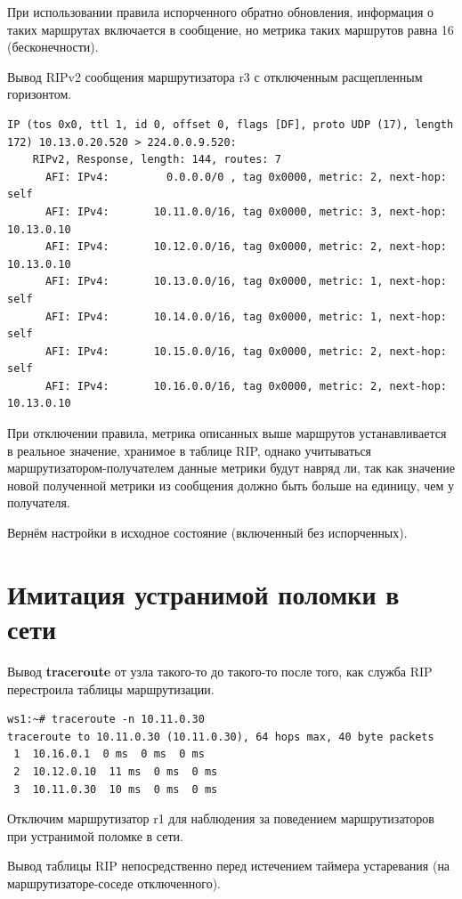 \documentclass[a4paper,12pt]{article}
\begin{document}
При использовании правила испорченного обратно обновления, информация о таких маршрутах включается в сообщение, но метрика таких маршрутов равна 16 (бесконечности).


Вывод RIPv2 сообщения маршрутизатора r3 с отключенным расщепленным горизонтом.

\begin{Verbatim}
IP (tos 0x0, ttl 1, id 0, offset 0, flags [DF], proto UDP (17), length 172) 10.13.0.20.520 > 224.0.0.9.520: 
	RIPv2, Response, length: 144, routes: 7
	  AFI: IPv4:         0.0.0.0/0 , tag 0x0000, metric: 2, next-hop: self
	  AFI: IPv4:       10.11.0.0/16, tag 0x0000, metric: 3, next-hop: 10.13.0.10
	  AFI: IPv4:       10.12.0.0/16, tag 0x0000, metric: 2, next-hop: 10.13.0.10
	  AFI: IPv4:       10.13.0.0/16, tag 0x0000, metric: 1, next-hop: self
	  AFI: IPv4:       10.14.0.0/16, tag 0x0000, metric: 1, next-hop: self
	  AFI: IPv4:       10.15.0.0/16, tag 0x0000, metric: 2, next-hop: self
	  AFI: IPv4:       10.16.0.0/16, tag 0x0000, metric: 2, next-hop: 10.13.0.10
\end{Verbatim}

При отключении правила, метрика описанных выше маршрутов устанавливается в реальное значение, хранимое в таблице RIP, однако учитываться маршрутизатором-получателем данные метрики будут навряд ли, так как значение новой полученной метрики из сообщения должно быть больше на единицу, чем у получателя.

Вернём настройки в исходное состояние (включенный без испорченных).

\section{Имитация устранимой поломки в сети}

Вывод \textbf{traceroute} от узла такого-то до такого-то после того, как служба RIP перестроила таблицы маршрутизации.

\begin{Verbatim}
ws1:~# traceroute -n 10.11.0.30
traceroute to 10.11.0.30 (10.11.0.30), 64 hops max, 40 byte packets
 1  10.16.0.1  0 ms  0 ms  0 ms
 2  10.12.0.10  11 ms  0 ms  0 ms
 3  10.11.0.30  10 ms  0 ms  0 ms
\end{Verbatim}

Отключим маршрутизатор r1 для наблюдения за поведением маршрутизаторов при устранимой поломке в сети.

Вывод таблицы RIP непосредственно перед истечением таймера устаревания (на маршрутизаторе-соседе отключенного).
\end{document}

